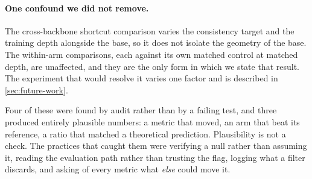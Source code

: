 \paragraph{One confound we did not remove.} The cross-backbone shortcut
comparison varies the consistency target and the training depth alongside
the base, so it does not isolate the geometry of the base. The within-arm
comparisons, each against its own matched control at matched depth,
are unaffected, and they are the only form in which we state that result.
The experiment that would resolve it varies one factor and is described in
\cref{sec:future-work}.

\medskip

Four of these were found by audit rather than by a failing test, and three
produced entirely plausible numbers: a metric that moved, an arm that beat
its reference, a ratio that matched a theoretical prediction. Plausibility
is not a check. The practices that caught them were verifying a null rather
than assuming it, reading the evaluation path rather than trusting the flag,
logging what a filter discards, and asking of every metric what \emph{else}
could move it.
